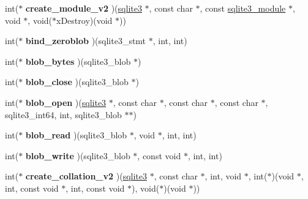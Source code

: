 \begin{DoxyCompactItemize}
\item 
\hypertarget{structsqlite3__api__routines_ad95940b07bd59f087160cf3a3428c8fa}{int($\ast$ {\bfseries create\-\_\-module\-\_\-v2} )(\hyperlink{structsqlite3}{sqlite3} $\ast$, const char $\ast$, const \hyperlink{structsqlite3__module}{sqlite3\-\_\-module} $\ast$, void $\ast$, void($\ast$x\-Destroy)(void $\ast$))}\label{structsqlite3__api__routines_ad95940b07bd59f087160cf3a3428c8fa}

\item 
\hypertarget{structsqlite3__api__routines_a1a1257f2722e96c06e8db5aa22aebddb}{int($\ast$ {\bfseries bind\-\_\-zeroblob} )(sqlite3\-\_\-stmt $\ast$, int, int)}\label{structsqlite3__api__routines_a1a1257f2722e96c06e8db5aa22aebddb}

\item 
\hypertarget{structsqlite3__api__routines_a435b470368220faf25063c1a673952ea}{int($\ast$ {\bfseries blob\-\_\-bytes} )(sqlite3\-\_\-blob $\ast$)}\label{structsqlite3__api__routines_a435b470368220faf25063c1a673952ea}

\item 
\hypertarget{structsqlite3__api__routines_a7b7749cb4e412443b7903205c0ebacf2}{int($\ast$ {\bfseries blob\-\_\-close} )(sqlite3\-\_\-blob $\ast$)}\label{structsqlite3__api__routines_a7b7749cb4e412443b7903205c0ebacf2}

\item 
\hypertarget{structsqlite3__api__routines_abec3f9100c800aaac49c7eb881f24d4c}{int($\ast$ {\bfseries blob\-\_\-open} )(\hyperlink{structsqlite3}{sqlite3} $\ast$, const char $\ast$, const char $\ast$, const char $\ast$, sqlite3\-\_\-int64, int, sqlite3\-\_\-blob $\ast$$\ast$)}\label{structsqlite3__api__routines_abec3f9100c800aaac49c7eb881f24d4c}

\item 
\hypertarget{structsqlite3__api__routines_a916f53dfaedab13e9fcf33c80b10c341}{int($\ast$ {\bfseries blob\-\_\-read} )(sqlite3\-\_\-blob $\ast$, void $\ast$, int, int)}\label{structsqlite3__api__routines_a916f53dfaedab13e9fcf33c80b10c341}

\item 
\hypertarget{structsqlite3__api__routines_a49a8e111c2b4f033b93820e0199a653e}{int($\ast$ {\bfseries blob\-\_\-write} )(sqlite3\-\_\-blob $\ast$, const void $\ast$, int, int)}\label{structsqlite3__api__routines_a49a8e111c2b4f033b93820e0199a653e}

\item 
\hypertarget{structsqlite3__api__routines_afeaa51f6fd046328ba845ebcacdeb335}{int($\ast$ {\bfseries create\-\_\-collation\-\_\-v2} )(\hyperlink{structsqlite3}{sqlite3} $\ast$, const char $\ast$, int, void $\ast$, int($\ast$)(void $\ast$, int, const void $\ast$, int, const void $\ast$), void($\ast$)(void $\ast$))}\label{structsqlite3__api__routines_afeaa51f6fd046328ba845ebcacdeb335}


\end{DoxyCompactItemize}
